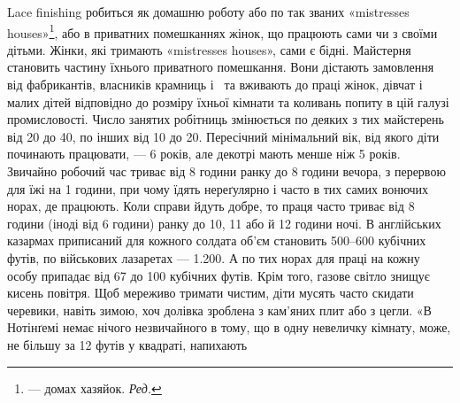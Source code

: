 Lace finishing робиться як домашню роботу або по так званих
«\textenglish{mistresses houses}»\footnote*{
— домах хазяйок. \emph{Ред.}
}, або в приватних помешканнях жінок, що
працюють сами чи з своїми дітьми. Жінки, які тримають «\textenglish{mistresses houses}», сами є бідні. Майстерня становить частину їхнього
приватного помешкання. Вони дістають замовлення від фабрикантів,
власників крамниць і~ та вживають до праці жінок,
дівчат і малих дітей відповідно до розміру їхньої кімнати та коливань
попиту в цій галузі промисловості. Число занятих робітниць
змінюється по деяких з тих майстерень від 20 до 40, по інших від
10 до 20. Пересічний мінімальний вік, від якого діти починають
працювати, — 6 років, але декотрі мають менше ніж 5 років. Звичайно
робочий час триває від 8 години ранку до 8 години вечора,
з перервою для їжі на 1 години, при чому їдять нереґулярно
і часто в тих самих вонючих норах, де працюють. Коли справи
йдуть добре, то праця часто триває від 8 години (іноді від 6 години)
ранку до 10, 11 або й 12 години ночі. В англійських казармах
приписаний для кожного солдата об’єм становить 500--600 кубічних
футів, по військових лазаретах — \num{1.200}. А по тих норах
для праці на кожну особу припадає від 67 до 100 кубічних
футів. Крім того, газове світло знищує кисень повітря. Щоб
мереживо тримати чистим, діти мусять часто скидати черевики,
навіть зимою, хоч долівка зроблена з кам’яних плит або з цегли.
«В Нотінґемі немає нічого незвичайного в тому, що в одну невеличку
кімнату, може, не більшу за 12 футів у квадраті, напихають
\parbreak{}  %
